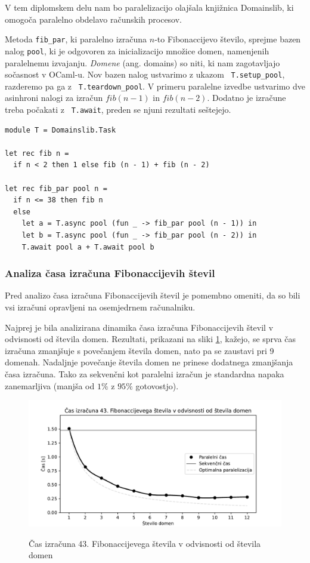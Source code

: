 \documentclass[fin1, tisk]{fmfdelo}
\begin{document}
V tem diplomskem delu nam bo paralelizacijo olajšala knjižnica Domainslib, ki omogoča paralelno obdelavo računskih procesov.

Metoda \texttt{fib\_par}, ki paralelno izračuna $n$-to Fibonaccijevo število, sprejme bazen nalog \texttt{pool},
ki je odgovoren za inicializacijo množice domen, namenjenih paralelnemu izvajanju.
\emph{Domene} (ang. domains) so niti, ki nam zagotavljajo sočasnost v OCaml-u.
Nov bazen nalog ustvarimo z ukazom ~\texttt{T.setup\_pool}, razderemo pa ga z ~\texttt{T.teardown\_pool}.
V primeru paralelne izvedbe ustvarimo dve asinhroni nalogi za izračun $fib(n-1)$ in $fib(n-2)$.
Dodatno je izračune treba počakati z ~\texttt{T.await}, preden se njuni rezultati seštejejo.

\begin{lstlisting}
module T = Domainslib.Task

let rec fib n = 
  if n < 2 then 1 else fib (n - 1) + fib (n - 2)

let rec fib_par pool n =
  if n <= 38 then fib n
  else
    let a = T.async pool (fun _ -> fib_par pool (n - 1)) in
    let b = T.async pool (fun _ -> fib_par pool (n - 2)) in
    T.await pool a + T.await pool b
\end{lstlisting}

\subsubsection{Analiza časa izračuna Fibonaccijevih števil}

Pred analizo časa izračuna Fibonaccijevih števil je pomembno omeniti, da so bili vsi izračuni opravljeni na
osemjedrnem računalniku.

Najprej je bila analizirana dinamika časa izračuna Fibonaccijevih števil v odvisnosti od števila domen. 
Rezultati, prikazani na sliki \ref{fig:fib_par_v_odvisnosti_od_domen}, kažejo, se sprva čas izračuna zmanjšuje
s povečanjem števila domen, nato pa se zaustavi pri 9 domenah. Nadaljnje povečanje števila domen ne prinese
dodatnega zmanjšanja časa izračuna. Tako za sekvenčni kot paralelni izračun je standardna napaka zanemarljiva (manjša od $1\%$ z $95\%$ gotovostjo).
\begin{figure}[h!]
\centering
\caption{Čas izračuna 43. Fibonaccijevega števila v odvisnosti od števila domen}
\includegraphics[width=13cm]{slike/fib_par_v_odvisnosti_od_domen.pdf}
\label{fig:fib_par_v_odvisnosti_od_domen}
\end{figure}
\end{document}

